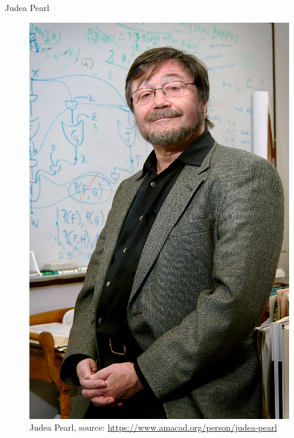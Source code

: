 \documentclass[handout]{beamer}
\begin{document}
\begin{frame}{Judea Pearl}

\begin{figure}[h!]
	\centering
	\includegraphics[scale=0.8]{pics/judea.jpg}
	\caption{Judea Pearl, source: \url{https://www.amacad.org/person/judea-pearl}}
	\end{figure} 


\end{frame}
\end{document}
